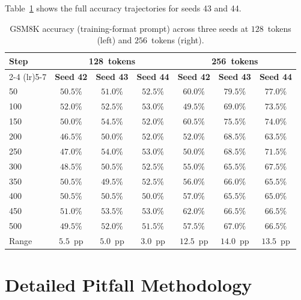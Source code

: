 \documentclass[pdflatex,sn-mathphys-ay,oneside]{sn-jnl}
\theoremstyle{thmstylethree}
\begin{document}
Table~\ref{tab:seed_rep} shows the full accuracy trajectories for seeds 43 and 44.

\begin{table}[h]
\centering
\caption{GSM8K accuracy (training-format prompt) across three seeds at $128$~tokens (left) and $256$~tokens (right).}
\label{tab:seed_rep}
\begin{tabular}{lcccccc}\toprule
\multirow{2}{*}{\textbf{Step}} & \multicolumn{3}{c}{\textbf{128~tokens}} & \multicolumn{3}{c}{\textbf{256~tokens}} \\
\cmidrule(lr){2-4} \cmidrule(lr){5-7}
 & \textbf{Seed 42} & \textbf{Seed 43} & \textbf{Seed 44} & \textbf{Seed 42} & \textbf{Seed 43} & \textbf{Seed 44} \\\midrule
50  & $50.5\%$ & $51.0\%$ & $52.5\%$ & $60.0\%$ & $79.5\%$ & $77.0\%$ \\
100 & $52.0\%$ & $52.5\%$ & $53.0\%$ & $49.5\%$ & $69.0\%$ & $73.5\%$ \\
150 & $50.0\%$ & $54.5\%$ & $52.0\%$ & $60.5\%$ & $75.5\%$ & $74.0\%$ \\
200 & $46.5\%$ & $50.0\%$ & $52.0\%$ & $52.0\%$ & $68.5\%$ & $63.5\%$ \\
250 & $47.0\%$ & $54.0\%$ & $53.0\%$ & $50.0\%$ & $68.5\%$ & $71.5\%$ \\
300 & $48.5\%$ & $50.5\%$ & $52.5\%$ & $55.0\%$ & $65.5\%$ & $67.5\%$ \\
350 & $50.5\%$ & $49.5\%$ & $52.5\%$ & $56.0\%$ & $66.0\%$ & $65.5\%$ \\
400 & $50.5\%$ & $50.5\%$ & $50.0\%$ & $57.0\%$ & $65.5\%$ & $65.0\%$ \\
450 & $51.0\%$ & $53.5\%$ & $53.0\%$ & $62.0\%$ & $66.5\%$ & $66.5\%$ \\
500 & $49.5\%$ & $52.0\%$ & $51.5\%$ & $57.5\%$ & $67.0\%$ & $66.5\%$ \\\midrule
Range & $5.5$~pp & $5.0$~pp & $3.0$~pp & $12.5$~pp & $14.0$~pp & $13.5$~pp \\\bottomrule
\end{tabular}
\end{table}

\section{Detailed Pitfall Methodology}\label{app:pitfall_details}
\end{document}
